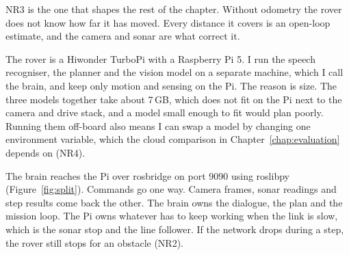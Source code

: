 NR3 is the one that shapes the rest of the chapter. Without odometry the rover
does not know how far it has moved. Every distance it covers is an open-loop
estimate, and the camera and sonar are what correct it.

\label{sec:architecture}

\label{ssec:split}

The rover is a Hiwonder TurboPi with a Raspberry Pi 5. I run the speech
recogniser, the planner and the vision model on a separate machine, which I call
the brain, and keep only motion and sensing on the Pi. The reason is size. The
three models together take about 7\,GB, which does not fit on the Pi next to the
camera and drive stack, and a model small enough to fit would plan poorly. Running
them off-board also means I can swap a model by changing one environment
variable, which the cloud comparison in Chapter~\ref{chap:evaluation} depends on
(NR4).

The brain reaches the Pi over rosbridge on port 9090 using roslibpy
(Figure~\ref{fig:split}). Commands go one way. Camera frames, sonar readings and
step results come back the other. The brain owns the dialogue, the plan and the
mission loop. The Pi owns whatever has to keep working when the link is slow,
which is the sonar stop and the line follower. If the network drops during a
step, the rover still stops for an obstacle (NR2).

